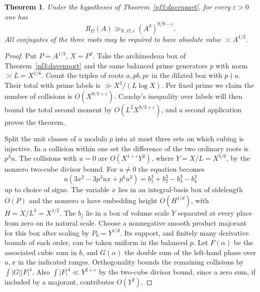 \documentclass[11pt,letterpaper]{article}
\newtheorem{theorem}{Theorem}[section]
\theoremstyle{definition}
\numberwithin{equation}{section}
\begin{document}
\begin{theorem}\label{nf3:vaughan}
Under the hypotheses of Theorem~\ref{nf3:davenport}, for every
$\varepsilon>0$ one has
\[
                  R_\Omega(A)\gg_{\mathbb K,\Omega,\varepsilon}
                                 (A^d)^{8/9-\varepsilon}.
\]
All conjugates of the three roots may be required to have absolute value
$\asymp A^{1/3}$.
\end{theorem}
\begin{proof}
Put $P=A^{1/3}$, $X=P^d$. Take the archimedean box of
Theorem~\ref{nf3:davenport} and the same balanced prime generators $p$
with norm $\asymp L=X^{1/6}$. Count the triples of roots $a,pb,pc$ in
the dilated box with $p\nmid a$. Their total with prime labels is
$\gg X^3/(L\log X)$. Per fixed prime we claim the number of collisions
is $O(X^{8/3+\varepsilon})$. Cauchy's inequality over labels will then
bound the total second moment by $O(L^2X^{8/3+\varepsilon})$,
and a second application proves the theorem.

Split the unit classes of $a$ modulo $p$ into at most three sets on
which cubing is injective. In a collision within one set the difference
of the two ordinary roots is $p^3u$. The collisions with $u=0$ are
$O(X^{1+\varepsilon}Y^2)$, where $Y=X/L=X^{5/6}$, by the nonzero
two-cube divisor bound. For $u\ne0$ the equation becomes
\[
 u(3x^2-3p^3ux+p^6u^2)=b_1^3+b_2^3-b_3^3-b_4^3
\]
up to choice of signs. The variable $x$ lies in an integral-basis
box of sidelength $O(P)$ and the nonzero $u$ have embedding height
$O(H^{1/d})$, with $H=X/L^3=X^{1/2}$. The $b_j$ lie in a box of volume
scale $Y$ separated at every place from zero on its natural scale.
Choose a nonnegative smooth product majorant for this box after scaling
by $P_0=Y^{1/d}$. Its support, and finitely many derivative bounds of
each order, can be taken uniform in the balanced $p$. Let $F(\alpha)$
be the associated cubic sum in $b$, and $G(\alpha)$ the double sum of
the left-hand phase over $u,x$ in the indicated ranges. Orthogonality
bounds the remaining collisions by $\int |G||F|^4$. Also
$\int |F|^4\ll Y^{2+\varepsilon}$ by the two-cube divisor bound, since a
zero sum, if included by a majorant, contributes $O(Y^2)$.


\end{proof}
\end{document}
